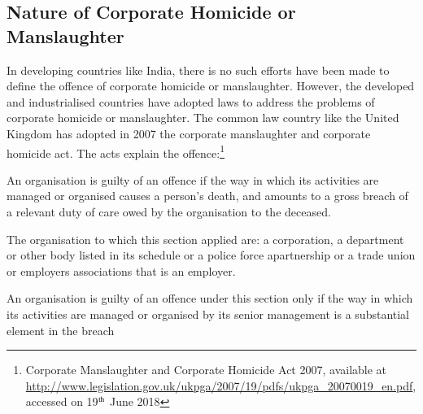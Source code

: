 \begin{multicols}{2}
\vspace{-.3cm}

\subsection{Nature of Corporate Homicide or\\ Manslaughter}\label{subsection-3.1}

\vspace{-.2cm}

\noi
In developing countries like India, there is no such efforts have been made to define
the offence of corporate homicide or manslaughter. However, the developed and
industrialised countries have adopted laws to address the problems of corporate
homicide or manslaughter. The common law country like the United Kingdom has
adopted in 2007 the corporate manslaughter and corporate homicide act. The acts
explain the offence:\footnote{Corporate Manslaughter and Corporate Homicide Act 2007, available at \url{http://www.legislation.gov.uk/ukpga/2007/19/pdfs/ukpga_20070019_en.pdf}, accessed on 19$^{\rm th}$ June 2018}

\vspace{-.45cm}

\noi
\begin{quoting}
An organisation is guilty of an offence if the way in which its activities are
managed or organised causes a person's death, and amounts to a gross breach of
a relevant duty of care owed by the organisation to the deceased.
\vspace{-.1cm}
\end{quoting}

\vspace{-.6cm}

\noi
\begin{quoting}
The organisation to which this section applied are: a corporation, a department
or other body listed in its schedule or a police force apartnership or a trade
union or employers associations that is an employer.

\vspace{-.15cm}

\end{quoting}

\vspace{-.7cm}

\noi
\begin{quoting}
An organisation is guilty of an offence under this section only if the way in
which its activities are managed or organised by its senior management is a
substantial element in the breach
\vspace{-.1cm}
\end{quoting}


\end{multicols}
